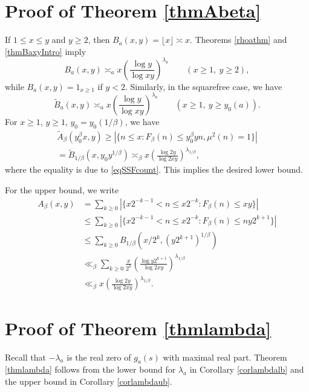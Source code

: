 \documentclass[11pt]{amsart}
\begin{document}
\section{Proof of Theorem \ref{thmAbeta}}\label{secAbeta}

If $1\le x \le y$ and $y\ge 2$, then $B_a(x,y)=\lfloor x \rfloor \asymp x$.
Theorems \ref{rhoathm} and \ref{thmBaxyIntro} imply
$$
B_a(x,y) \asymp_a x \left(\frac{\log y}{\log xy} \right)^{\lambda_a} \qquad (x\ge 1, \ y\ge 2),
$$
while $B_{a}(x,y) =1_{x\ge 1}$ if $y<2$. 
Similarly, in the squarefree case, we have
$$
\tilde{B}_a(x,y) \asymp_a x \left(\frac{\log y}{\log xy} \right)^{\lambda_a} \qquad (x\ge 1, \ y\ge y_0(a)).
$$
For $x\ge 1$, $y\ge 1$, $y_0=y_0(1/\beta)$, we have
\begin{multline*}
\tilde{A}_\beta(y_0^\beta x, y) \ge |\{n\le x: F_\beta(n)\le y_0^\beta y n, \mu^2(n)=1\}| \\
=\tilde{B}_{1/\beta}(x,y_0 y^{1/\beta}) \asymp_\beta x  \left(\frac{\log 2y}{\log 2xy} \right)^{\lambda_{1/\beta}} ,
\end{multline*}
where the equality is due to \eqref{eqSSFcount}.
This implies the desired lower bound.

For the upper bound, we write
\begin{equation*}
\begin{split}
A_\beta(x,y) &= \sum_{k\ge 0 } |\{ x 2^{-k-1} < n \le x 2^{-k}: F_\beta(n) \le x y\}| \\
 & \le \sum_{k\ge 0 } |\{ x 2^{-k-1} < n \le x 2^{-k}: F_\beta(n) \le n y 2^{k+1}\}| \\
 & \le \sum_{k\ge 0 } B_{1/\beta}(x/2^k, (y 2^{k+1})^{1/\beta} ) \\
 & \ll_\beta \sum_{k\ge 0} \frac{x}{2^k} \left(\frac{\log y 2^{k+1} }{\log 2 xy}\right)^{\lambda_{1/\beta}}\\
  & \ll_\beta  x  \left(\frac{\log 2y}{\log 2xy} \right)^{\lambda_{1/\beta}}.
\end{split}
\end{equation*}






\section{Proof of Theorem \ref{thmlambda}}\label{seclambda}


Recall that $-\lambda_a$ is the real zero of $g_a(s)$ with maximal real part. 
Theorem \ref{thmlambda} follows from the lower bound for $\lambda_a$ in Corollary \ref{corlambdalb} and the upper bound in Corollary \ref{corlambdaub}.
\end{document}
